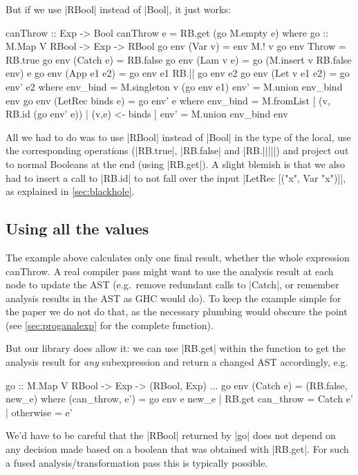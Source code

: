\documentclass[manuscript,review,screen,acmsmall]{acmart}
\begin{document}
But if we use |RBool| instead of |Bool|, it just works:
\restorecolumns
\begin{code}
canThrow :: Exp -> Bool
canThrow e = RB.get (go M.empty e)
  where
    go :: M.Map V RBool -> Exp -> RBool
    go env (Var v)          = env M.! v
    go env Throw            = RB.true
    go env (Catch e)        = RB.false
    go env (Lam v e)        = go (M.insert v RB.false env) e
    go env (App e1 e2)      = go env e1 RB.|| go env e2
    go env (Let v e1 e2)    = go env' e2
      where
        env_bind  = M.singleton v (go env e1)
        env'      = M.union env_bind env
    go env (LetRec binds e) = go env' e
      where
        env_bind  = M.fromList [ (v, RB.id (go env' e)) | (v,e) <- binds ]
        env'      = M.union env_bind env
\end{code}
All we had to do was to use |RBool| instead of |Bool| in the type of the local, use the corresponding operations (|RB.true|, |RB.false| and |RB.|||||) and  project out to normal Booleans at the end (using |RB.get|). A slight blemish is that we also had to insert a call to |RB.id| to not fall over the input |LetRec [("x", Var "x")]|, as explained in \cref{sec:blackhole}.

\subsection{Using all the values}\label{sec:all-values}

The example above calculates only one final result, whether the whole expression canThrow. A real compiler pass might want to use the analysis result at each node to update the AST (e.g.\ remove redundant calls to |Catch|, or remember analysis results in the AST as GHC would do). To keep the example simple for the paper we do not do that, as the necessary plumbing would obscure the point (see \cref{sec:proganalexp} for the complete function).

But our library does allow it: we can use |RB.get| within the function to get the analysis result for \emph{any} subexpression and return a changed AST accordingly, e.g.
\restorecolumns
\begin{code}
    go :: M.Map V RBool -> Exp -> (RBool, Exp)
    ...
    go env (Catch e)        = (RB.false, new_e)
      where
        (can_throw, e') = go env e
        new_e  |  RB.get can_throw  = Catch e'
               |  otherwise         = e'
\end{code}
We'd have to be careful that the |RBool| returned by |go| does not depend on any decision made based on a boolean that was obtained with |RB.get|. For such a fused analysis/transformation pass this is typically possible.
\end{document}
